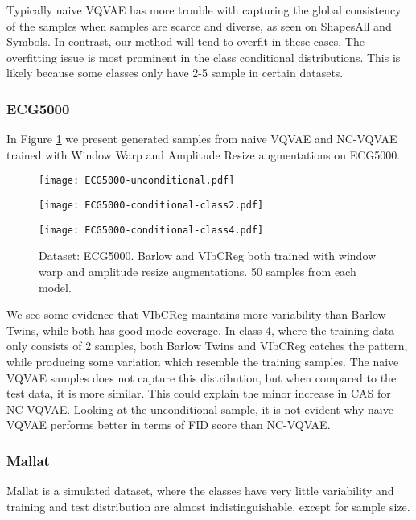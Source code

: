\documentclass[../../thesis.tex]{subfiles}
\begin{document}
Typically naive VQVAE has more trouble with capturing the global consistency of the samples when samples are scarce and diverse, as seen on ShapesAll and Symbols. In contrast, our method will tend to overfit in these cases. The overfitting issue is most prominent in the class conditional distributions. This is likely because some classes only have 2-5 sample in certain datasets.

\subsubsection{ECG5000}

In Figure \ref{fig:Warp_ECG5000} we present generated samples from naive VQVAE and NC-VQVAE trained with Window Warp and Amplitude Resize augmentations on ECG5000.\newline


\begin{figure}[h]
    \centering
    \begin{minipage}[b]{0.32\textwidth}
        \centering
        \texttt{[image: ECG5000-unconditional.pdf]}
    \end{minipage}
    \begin{minipage}[b]{0.32\textwidth}
        \centering
        \texttt{[image: ECG5000-conditional-class2.pdf]}
    \end{minipage}
    \begin{minipage}[b]{0.32\textwidth}
        \centering
        \texttt{[image: ECG5000-conditional-class4.pdf]}
    \end{minipage}
    \caption{Dataset: ECG5000. Barlow and VIbCReg both trained with window warp and amplitude resize augmentations. 50 samples from each model.}
    \label{fig:Warp_ECG5000}
\end{figure}


We see some evidence that VIbCReg maintains more variability than Barlow Twins, while both has good mode coverage. In class 4, where the training data only consists of 2 samples, both Barlow Twins and VIbCReg catches the pattern, while producing some variation which resemble the training samples. The naive VQVAE samples does not capture this distribution, but when compared to the test data, it is more similar. This could explain the minor increase in CAS for NC-VQVAE. 
Looking at the unconditional sample, it is not evident why naive VQVAE performs better in terms of FID score than NC-VQVAE.


\subsubsection{Mallat}
Mallat is a simulated dataset, where the classes have very little variability and training and test distribution are almost indistinguishable, except for sample size. \newline
\end{document}
